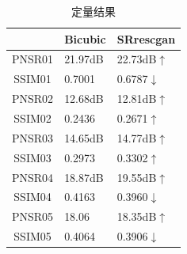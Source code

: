 \begin{table}[!htbp]
    \centering
    \begin{tabular}{c|p{3cm}|p{3cm}}
        \hline
                 & Bicubic & SRrescgan     \\ \hline
        PNSR01 & 21.97dB   & 22.73dB$\uparrow$    \\ \hline
        SSIM01 & 0.7001   & 0.6787$\downarrow$     \\ \hline
        PNSR02 & 12.68dB   & 12.81dB$\uparrow$     \\ \hline
        SSIM02 & 0.2436   & 0.2671$\uparrow$     \\ \hline
        PNSR03 & 14.65dB   & 14.77dB$\uparrow$     \\ \hline
        SSIM03 & 0.2973   & 0.3302$\uparrow$    \\ \hline
        PNSR04 & 18.87dB   & 19.55dB$\uparrow$     \\ \hline
        SSIM04 & 0.4163   & 0.3960$\downarrow$     \\ \hline
        PNSR05 & 18.06   & 18.35dB$\uparrow$     \\ \hline
        SSIM05 & 0.4064   & 0.3906$\downarrow$     \\ \hline

    \end{tabular}
    \caption{定量结果}
\end{table}


